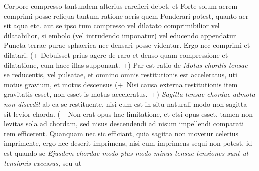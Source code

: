 \pend 
\pstart {} Corpore compresso tantundem alterius rarefieri debet, et 
\pend 
\pstart {} Forte solum aerem comprimi posse reliqua tantum ratione aeris quem 
\pend 
\pstart {} Ponderari potest, quanto aer sit aqua etc. aut se ipso tum compresso vel dilatato comprimibilior vel dilatabilior, si embolo (vel intrudendo imponatur) vel educendo appendatur \pend \pstart {} Puncta terrae purae sphaerica  nec densari posse videntur. Ergo nec comprimi et dilatari. (+ Debuisset prius agere de raro et denso quam compressione et dilatatione, cum haec illas supponant. +) Par est ratio de 
\pend 
\pstart {}
\textit{Motus chordis tensae}\protect{} se reducentis, vel pulsatae, et omnino omnis restitutionis est acceleratus, uti motus gravium\protect{}, et motus descensus 
(+~Nisi causa externa restitutionis item gravitatis esset, non esset is motus acceleratus.~+)
\pend 
\pstart {}
\textit{Sagitta\protect{} tensae chordae admota non discedit} ab ea se restituente, nisi cum est in situ naturali modo non sagitta sit levior chorda. (+ Non erat opus hac limitatione, et etsi opus esset, tamen non levitas sola ad chordam, sed nisus descendendi ad nisum impellendi comparati rem efficerent. Quanquam nec sic efficiant, quia sagitta non movetur celerius imprimente, ergo nec deserit imprimens, nisi cum imprimens sequi non potest, id est quando se 
\pend 
\count{}
\count{}
\count{}
\pstart {}
\textit{Ejusdem chordae modo plus modo minus tensae tensiones sunt ut tensionis excessus,} seu ut 
